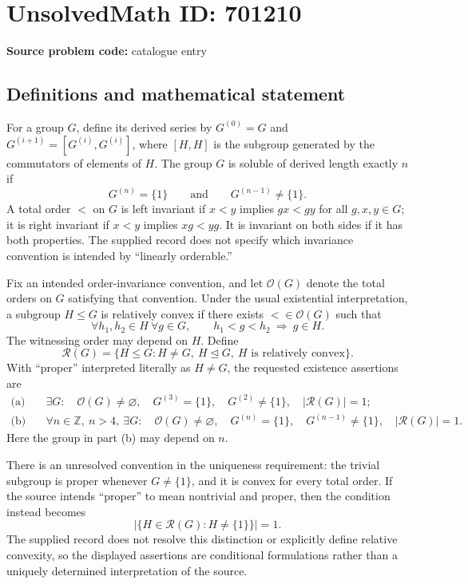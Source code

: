 \documentclass[11pt]{article}
\begin{document}
\section*{UnsolvedMath ID: 701210}
\textbf{Source problem code:} catalogue entry
\subsection{Definitions and mathematical statement}
For a group \(G\), define its derived series by \(G^{(0)}=G\) and \(G^{(i+1)}=[G^{(i)},G^{(i)}]\), where \([H,H]\) is the subgroup generated by the commutators of elements of \(H\). The group \(G\) is soluble of derived length exactly \(n\) if
\[
G^{(n)}=\{1\}\qquad\text{and}\qquad G^{(n-1)}\ne\{1\}.
\]
A total order \(<\) on \(G\) is left invariant if \(x<y\) implies \(gx<gy\) for all \(g,x,y\in G\); it is right invariant if \(x<y\) implies \(xg<yg\). It is invariant on both sides if it has both properties. The supplied record does not specify which invariance convention is intended by ``linearly orderable.''

Fix an intended order-invariance convention, and let \(\mathcal O(G)\) denote the total orders on \(G\) satisfying that convention. Under the usual existential interpretation, a subgroup \(H\le G\) is relatively convex if there exists \(<\in\mathcal O(G)\) such that
\[
\forall h_1,h_2\in H\ \forall g\in G,\qquad
h_1<g<h_2\ \Longrightarrow\ g\in H.
\]
The witnessing order may depend on \(H\). Define
\[
\mathcal R(G)=\{H\le G: H\ne G,\ H\trianglelefteq G,\ H\text{ is relatively convex}\}.
\]
With ``proper'' interpreted literally as \(H\ne G\), the requested existence assertions are
\[
\begin{aligned}
\text{(a)}\quad &\exists G:\quad \mathcal O(G)\ne\varnothing,\quad G^{(3)}=\{1\},\quad G^{(2)}\ne\{1\},\quad |\mathcal R(G)|=1;\\
\text{(b)}\quad &\forall n\in\mathbb Z,\ n>4,\ \exists G:\quad \mathcal O(G)\ne\varnothing,\quad G^{(n)}=\{1\},\quad G^{(n-1)}\ne\{1\},\quad |\mathcal R(G)|=1.
\end{aligned}
\]
Here the group in part (b) may depend on \(n\).

There is an unresolved convention in the uniqueness requirement: the trivial subgroup is proper whenever \(G\ne\{1\}\), and it is convex for every total order. If the source intends ``proper'' to mean nontrivial and proper, then the condition instead becomes
\[
\bigl|\{H\in\mathcal R(G):H\ne\{1\}\}\bigr|=1.
\]
The supplied record does not resolve this distinction or explicitly define relative convexity, so the displayed assertions are conditional formulations rather than a uniquely determined interpretation of the source.
\end{document}
